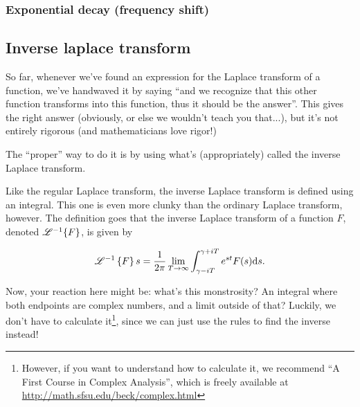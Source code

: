 \subsubsection{Exponential decay (frequency shift)}\label{sec:decay}
\subsection{Inverse laplace transform}

So far, whenever we've found an expression for the Laplace transform of a function, we've handwaved it by saying ``and we recognize that this other function transforms into this function, thus it should be the answer''. This gives the right answer (obviously, or else we wouldn't teach you that...), but it's not entirely rigorous (and mathematicians love rigor!)

The ``proper'' way to do it is by using what's (appropriately) called the inverse Laplace transform.

Like the regular Laplace transform, the inverse Laplace transform is defined using an integral. This one is even more clunky than the ordinary Laplace transform, however. The definition goes that the inverse Laplace transform of a function $F$, denoted $\mathscr{L}^{-1}\{F\}$,  is given by

\begin{equation*}
    \mathscr{L}^{-1} \left\{F\right\} s = \frac{1}{2\pi} \lim_{T\to\infty} \int_{\gamma - iT}^{\gamma + iT} e^{st} F(s) \dd s.
\end{equation*}

Now, your reaction here might be: what's this monstrosity? An integral where both endpoints are complex numbers, and a limit outside of that? Luckily, we don't have to calculate it\footnote{However, if you want to understand how to calculate it, we recommend ``A First Course in Complex Analysis'', which is freely available at \url{http://math.sfsu.edu/beck/complex.html}}, since we can just use the rules to find the inverse instead! 



